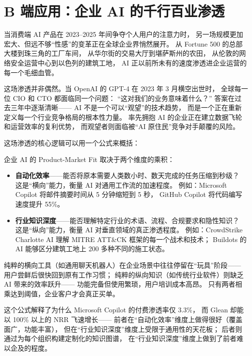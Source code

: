 \chapter{B 端应用：企业 AI 的千行百业渗透}
\label{ch:enterprise}


当消费端 AI 产品在 2023--2025 年间争夺个人用户的注意力时，
另一场规模更加宏大、但远不够``性感''的变革正在全球企业界悄然展开。
从 Fortune 500 的总部大楼到珠三角的工厂车间，
从华尔街的交易大厅到堪萨斯州的农田，
从伦敦的网络安全运营中心到以色列的建筑工地，
AI 正以前所未有的速度渗透进企业运营的每一个毛细血管。

这场渗透并非偶然。当 OpenAI 的 GPT-4 在 2023 年 3 月横空出世时，
全球每一位 CIO 和 CTO 都面临同一个问题：
``这对我们的业务意味着什么？''
答案在过去三年中逐渐清晰——
AI 不是一个可以``观望''的技术趋势，
而是一个正在重新定义每一个行业竞争格局的根本性力量。
率先拥抱 AI 的企业正在建立数据飞轮和运营效率的复利优势，
而观望者则面临被``AI 原住民''竞争对手颠覆的风险。

这场渗透的核心逻辑可以用一个公式来概括：

\begin{keybox}
企业 AI 的 Product-Market Fit 取决于两个维度的乘积：
\begin{itemize}[noitemsep]
  \item \textbf{自动化效率}——能否将原本需要人类数小时、数天完成的任务压缩到秒级？
        这是``横向''能力，衡量 AI 对通用工作流的加速程度。
        例如：Microsoft Copilot 将邮件摘要时间从 5 分钟缩短到 5 秒，
        GitHub Copilot 将代码编写速度提升 55\%。
  \item \textbf{行业知识深度}——能否理解特定行业的术语、流程、合规要求和隐性知识？
        这是``纵向''能力，衡量 AI 对垂直领域的真正渗透程度。
        例如：CrowdStrike Charlotte AI 理解 MITRE ATT\&CK 框架的每一个战术和技术；
        Buildots 的 AI 能够区分建筑工地上 200 多种不同的施工状态。
\end{itemize}
纯粹的横向工具（如通用聊天机器人）在企业场景中往往停留在``玩具''阶段——
用户尝鲜后很快回到原有工作习惯；
纯粹的纵向知识（如传统行业软件）则缺乏 AI 带来的效率跃升——
功能完备但使用繁琐，用户培训成本高昂。
只有两者相乘达到阈值，企业客户才会真正买单。

这个公式解释了为什么 Microsoft Copilot 的付费渗透率仅 3.3\%，
而 Glean 却能以 100\% 以上的 NRR 飞速增长——
前者在``自动化效率''维度上做得很好（覆盖面广，功能丰富），
但在``行业知识深度''维度上受限于通用性的天花板；
后者则通过为每个组织构建定制化的知识图谱，
在``行业知识深度''维度上做到了前者难以企及的程度。
\end{keybox}

